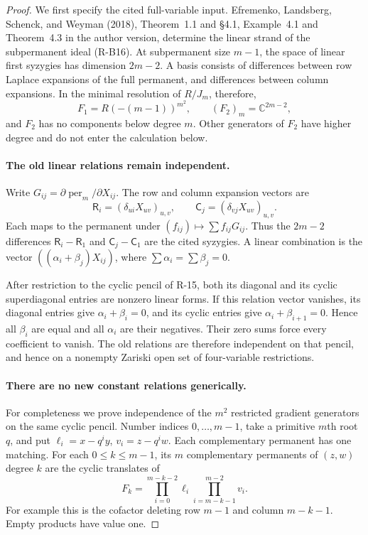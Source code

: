 \documentclass[11pt,a4paper]{article}
\theoremstyle{definition}\newtheorem{definition}{Definition}
\begin{document}
\begin{proof}
We first specify the cited full-variable input. Efremenko, Landsberg,
Schenck, and Weyman (2018), Theorem~1.1 and \S4.1, Example~4.1
and Theorem~4.3 in the author version, determine the linear strand
of the subpermanent ideal (R-B16). At subpermanent size $m-1$, the
space of linear first syzygies has dimension $2m-2$. A basis consists
of differences between row Laplace expansions of the full permanent,
and differences between column expansions. In the minimal resolution
of $R/J_m$, therefore,
\begin{equation}\label{R23:resolution_start}
 F_1=R(-(m-1))^{m^2},\qquad
 (F_2)_m=\mathbb C^{2m-2},
\end{equation}
and $F_2$ has no components below degree $m$. Other generators of
$F_2$ have higher degree and do not enter the calculation below.

\paragraph{The old linear relations remain independent.}
Write $G_{ij}=\partial\operatorname{per}_m/\partial X_{ij}$.
The row and column expansion vectors are
\[
 \mathsf R_i=(\delta_{ui}X_{uv})_{u,v},\qquad
 \mathsf C_j=(\delta_{vj}X_{uv})_{u,v}.
\]
Each maps to the permanent under $(f_{ij})\mapsto\sum f_{ij}G_{ij}$.
Thus the $2m-2$ differences
$\mathsf R_i-\mathsf R_1$ and $\mathsf C_j-\mathsf C_1$ are
the cited syzygies. A linear combination is the vector
$((\alpha_i+\beta_j)X_{ij})$, where
$\sum\alpha_i=\sum\beta_j=0$.

After restriction to the cyclic pencil of R-15, both its diagonal
and its cyclic superdiagonal entries are nonzero linear forms.
If this relation vector vanishes, its diagonal entries give
$\alpha_i+\beta_i=0$, and its cyclic entries give
$\alpha_i+\beta_{i+1}=0$. Hence all $\beta_i$ are equal and all
$\alpha_i$ are their negatives. Their zero sums force every
coefficient to vanish. The old relations are therefore independent
on that pencil, and hence on a nonempty Zariski open set of
four-variable restrictions.

\paragraph{There are no new constant relations generically.}
For completeness we prove independence of the $m^2$ restricted
gradient generators on the same cyclic pencil. Number indices
$0,\ldots,m-1$, take a primitive $m$th root $q$, and put
$\ell_i=x-q^iy$, $v_i=z-q^iw$. Each complementary permanent has
one matching. For each $0\leq k\leq m-1$, its $m$ complementary
permanents of $(z,w)$ degree $k$ are the cyclic translates of
\begin{equation}\label{R23:cofactor_orbit}
 F_k=\prod_{i=0}^{m-k-2}\ell_i
                 \prod_{i=m-k-1}^{m-2}v_i.
\end{equation}
For example this is the cofactor deleting row $m-1$ and column
$m-k-1$. Empty products have value one.


\end{proof}
\end{document}
